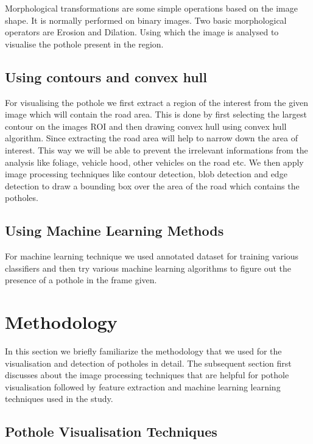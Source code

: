 \documentclass[journal]{IEEEtran}
\begin{document}
Morphological transformations are some simple operations based on the image shape. It is normally performed on binary images. Two basic morphological operators are Erosion and Dilation. Using which the image is analysed to visualise the pothole present in the region.


\subsection{Using contours and convex hull}

For visualising the pothole we first extract a region of the interest from the given image which will contain the road area. This is done by first selecting the largest contour on the images ROI and then drawing convex hull using convex hull algorithm. Since extracting the road area will help to narrow down the area of interest. This way we will be able to prevent the irrelevant informations from the analysis like foliage, vehicle hood, other vehicles on the road etc. We then apply image processing techniques like contour detection, blob detection and edge detection to draw a bounding box over the area of the road which contains the potholes.

\subsection{Using Machine Learning Methods}
For machine learning technique we used annotated dataset \cite{dataset} for training various classifiers and then try various machine learning algorithms to figure out the presence of a pothole in the frame given.

\section{Methodology}

In this section we briefly familiarize the methodology that we used for the visualisation and detection of potholes in detail. The subsequent section first discusses about the image processing techniques that are helpful for pothole visualisation followed by feature extraction and machine learning learning techniques  used in the study.

\subsection{Pothole Visualisation Techniques}
\end{document}
